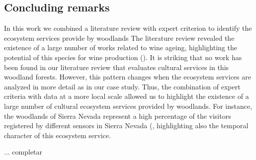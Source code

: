 \subsection{Concluding remarks}\label{sec:es:spatial} 
In this work we combined a literature review with expert criterion to identify the ecosystem services provide by \Qp woodlands The literature review revealed the existence of a large number of works related to wine ageing, highlighting the potential of this species for wine production (). It is striking that no work has been found in our literature review that evaluates cultural services in this woodland forests. However, this pattern changes when the ecosystem services are analyzed in more detail as in our case study. Thus, the combination of expert criteria with data at a more local scale allowed us to highlight the existence of a large number of cultural ecosystem services provided by \Qp woodlands. For instance, the \Qp woodlands of Sierra Nevada represent a high percentage of the visitors registered by different sensors in Sierra Nevada (, highlighting also the temporal character of this ecosystem service. 

... completar 






